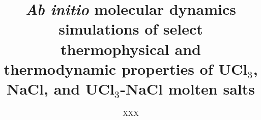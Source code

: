 \documentclass[preprint,3p,10pt,twocolumn,number,sort&compress]{elsarticle}
\begin{document}
\begin{frontmatter}



\title{\textit{Ab initio} molecular dynamics simulations of select thermophysical and thermodynamic properties of UCl$_3$, NaCl, and UCl$_3$-NaCl molten salts}


\author{XXX}


\end{frontmatter}
\end{document}
